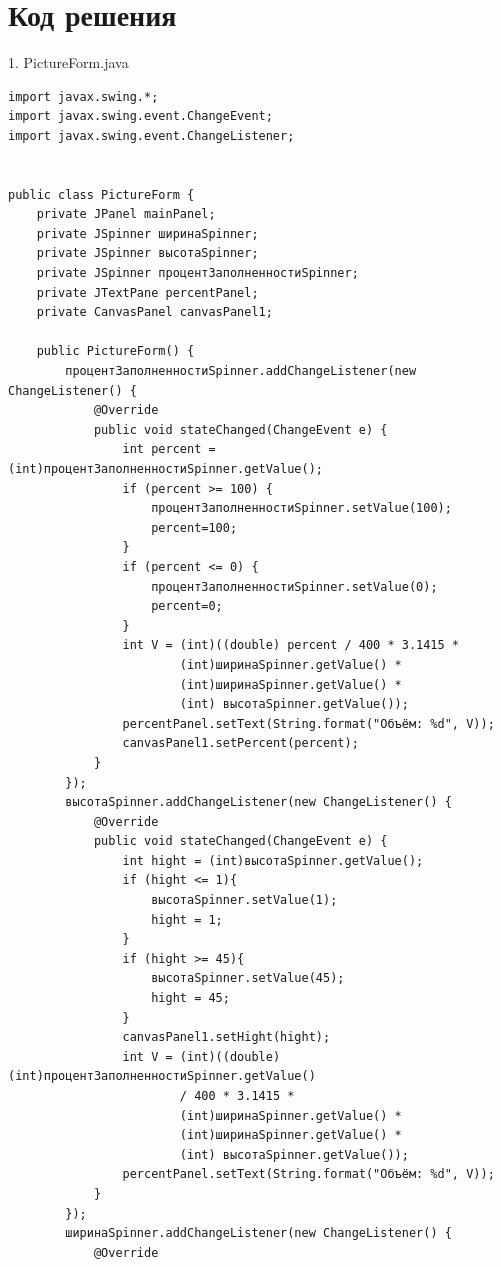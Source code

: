 ﻿\documentclass[a4paper, 12pt]{extarticle}
\begin{document}
\section{Код решения}
1. PictureForm.java
\begin{verbatim}
import javax.swing.*;
import javax.swing.event.ChangeEvent;
import javax.swing.event.ChangeListener;


public class PictureForm {
    private JPanel mainPanel;
    private JSpinner ширинаSpinner;
    private JSpinner высотаSpinner;
    private JSpinner процентЗаполненностиSpinner;
    private JTextPane percentPanel;
    private CanvasPanel canvasPanel1;

    public PictureForm() {
        процентЗаполненностиSpinner.addChangeListener(new ChangeListener() {
            @Override
            public void stateChanged(ChangeEvent e) {
                int percent = (int)процентЗаполненностиSpinner.getValue();
                if (percent >= 100) {
                    процентЗаполненностиSpinner.setValue(100);
                    percent=100;
                }
                if (percent <= 0) {
                    процентЗаполненностиSpinner.setValue(0);
                    percent=0;
                }
                int V = (int)((double) percent / 400 * 3.1415 *
                        (int)ширинаSpinner.getValue() *
                        (int)ширинаSpinner.getValue() *
                        (int) высотаSpinner.getValue());
                percentPanel.setText(String.format("Объём: %d", V));
                canvasPanel1.setPercent(percent);
            }
        });
        высотаSpinner.addChangeListener(new ChangeListener() {
            @Override
            public void stateChanged(ChangeEvent e) {
                int hight = (int)высотаSpinner.getValue();
                if (hight <= 1){
                    высотаSpinner.setValue(1);
                    hight = 1;
                }
                if (hight >= 45){
                    высотаSpinner.setValue(45);
                    hight = 45;
                }
                canvasPanel1.setHight(hight);
                int V = (int)((double) (int)процентЗаполненностиSpinner.getValue()
                        / 400 * 3.1415 *
                        (int)ширинаSpinner.getValue() *
                        (int)ширинаSpinner.getValue() *
                        (int) высотаSpinner.getValue());
                percentPanel.setText(String.format("Объём: %d", V));
            }
        });
        ширинаSpinner.addChangeListener(new ChangeListener() {
            @Override

\end{verbatim}
\end{document}
